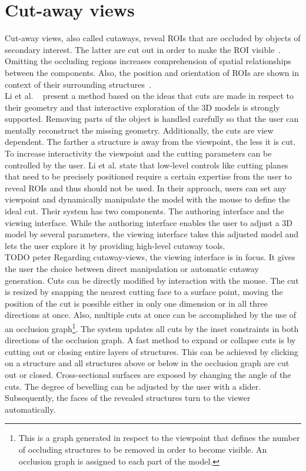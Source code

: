 \section{Cut-away views}
Cut-away views, also called cutaways, reveal ROIs that are occluded by objects of secondary interest. The latter are cut out in order to make the ROI visible~\cite{proc:volumeshop}\cite{jour:adaptiveCutaways}\cite{jour:correa}\cite{incoll:cutawayIllustration}. Omitting the occluding regions increases comprehension of spatial relationships between the components. Also, the position and orientation of ROIs are shown in context of their surrounding structures~\cite{jour:interactiveCutaway}.\\
\newline
Li et al. ~\cite{jour:interactiveCutaway} present a method based on the ideas that cuts are made in respect to their geometry and that interactive exploration of the 3D models is strongly supported. Removing parts of the object is handled carefully so that the user can mentally reconstruct the missing geometry. Additionally, the cuts are view dependent. The farther a structure is away from the viewpoint, the less it is cut. To increase interactivity the viewpoint and the cutting parameters can be controlled by the user. Li et al. state that low-level controls like cutting planes that need to be precisely positioned require a certain expertise from the user to reveal ROIs and thus should not be used. In their approach, users can set any viewpoint and dynamically manipulate the model with the mouse to define the ideal cut. Their system has two components. The authoring interface and the viewing interface. While the authoring interface enables the user to adjust a 3D model by several parameters, the viewing interface takes this adjusted model and lets the user explore it by providing high-level cutaway tools.\\
TODO peter
Regarding cutaway-views, the viewing interface is in focus. It gives the user the choice between direct manipulation or automatic cutaway generation. Cuts can be directly modified by interaction with the mouse. The cut is resized by snapping the nearest cutting face to a surface point, moving the position of the cut is possible either in only one dimension or in all three directions at once. Also, multiple cuts at once can be accomplished by the use of an occlusion graph\footnote{This is a graph generated in respect to the viewpoint that defines the number of occluding structures to be removed in order to become visible. An occlusion graph is assigned to each part of the model.}. The system updates all cuts by the inset constraints in both directions of the occlusion graph. A fast method to expand or collapse cuts is by cutting out or closing entire layers of structures. This can be achieved by clicking on a structure and all structures above or below in the occlusion graph are cut out or closed. Cross-sectional surfaces are exposed by changing the angle of the cuts. The degree of bevelling can be adjusted by the user with a slider. Subsequently, the faces of the revealed structures turn to the viewer automatically.\\
